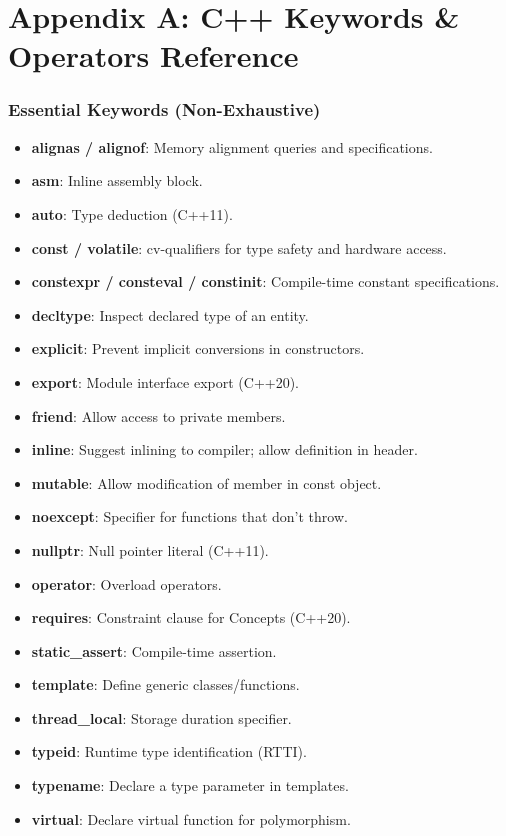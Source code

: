 \hypertarget{appendix-a-c-keywords-operators-reference}{%
\section{Appendix A: C++ Keywords \& Operators
Reference}\label{appendix-a-c-keywords-operators-reference}}

\hypertarget{essential-keywords-non-exhaustive}{%
\subsubsection{Essential Keywords
(Non-Exhaustive)}\label{essential-keywords-non-exhaustive}}

\begin{itemize}
\tightlist
\item
  \textbf{alignas / alignof}: Memory alignment queries and
  specifications.
\item
  \textbf{asm}: Inline assembly block.
\item
  \textbf{auto}: Type deduction (C++11).
\item
  \textbf{const / volatile}: cv-qualifiers for type safety and hardware
  access.
\item
  \textbf{constexpr / consteval / constinit}: Compile-time constant
  specifications.
\item
  \textbf{decltype}: Inspect declared type of an entity.
\item
  \textbf{explicit}: Prevent implicit conversions in constructors.
\item
  \textbf{export}: Module interface export (C++20).
\item
  \textbf{friend}: Allow access to private members.
\item
  \textbf{inline}: Suggest inlining to compiler; allow definition in
  header.
\item
  \textbf{mutable}: Allow modification of member in const object.
\item
  \textbf{noexcept}: Specifier for functions that don't throw.
\item
  \textbf{nullptr}: Null pointer literal (C++11).
\item
  \textbf{operator}: Overload operators.
\item
  \textbf{requires}: Constraint clause for Concepts (C++20).
\item
  \textbf{static\_assert}: Compile-time assertion.
\item
  \textbf{template}: Define generic classes/functions.
\item
  \textbf{thread\_local}: Storage duration specifier.
\item
  \textbf{typeid}: Runtime type identification (RTTI).
\item
  \textbf{typename}: Declare a type parameter in templates.
\item
  \textbf{virtual}: Declare virtual function for polymorphism.
\end{itemize}

